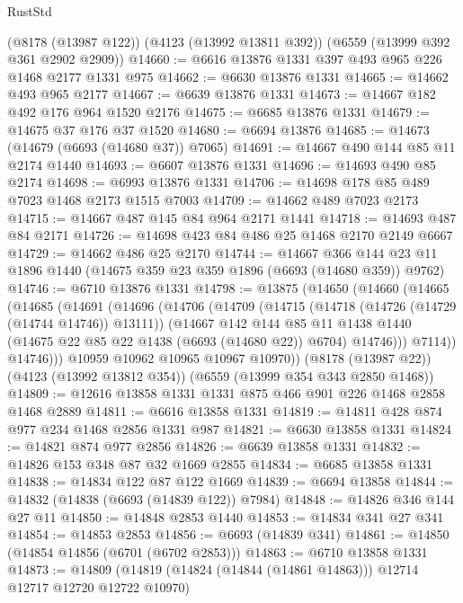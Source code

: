 \begin{lexlean}{RustStd}
\begin{coremodule}
    (@8178 (@13987 @122))
    (@4123 (@13992 @13811 @392))
    (@6559 (@13999 @392 @361 @2902 @2909))
@14660 := @6616 @13876 @1331 @397 @493 @965 @226 @1468 @2177 @1331 @975
@14662 := @6630 @13876 @1331
@14665 := @14662 @493 @965 @2177
@14667 := @6639 @13876 @1331
@14673 := @14667 @182 @492 @176 @964 @1520 @2176
@14675 := @6685 @13876 @1331
@14679 := @14675 @37 @176 @37 @1520
@14680 := @6694 @13876
@14685 := @14673 (@14679 (@6693 (@14680 @37)) @7065)
@14691 := @14667 @490 @144 @85 @11 @2174 @1440
@14693 := @6607 @13876 @1331
@14696 := @14693 @490 @85 @2174
@14698 := @6993 @13876 @1331
@14706 := @14698 @178 @85 @489 @7023 @1468 @2173 @1515 @7003
@14709 := @14662 @489 @7023 @2173
@14715 := @14667 @487 @145 @84 @964 @2171 @1441
@14718 := @14693 @487 @84 @2171
@14726 := @14698 @423 @84 @486 @25 @1468 @2170 @2149 @6667
@14729 := @14662 @486 @25 @2170
@14744 := @14667
    @366
    @144
    @23
    @11
    @1896
    @1440
    (@14675 @359 @23 @359 @1896 (@6693 (@14680 @359)) @9762)
@14746 := @6710 @13876 @1331
@14798 := @13875
    (@14650
      (@14660
        (@14665
          (@14685
            (@14691
              (@14696
                (@14706
                  (@14709
                    (@14715
                      (@14718 (@14726 (@14729 (@14744 @14746)) @13111))
                      (@14667
                        @142
                        @144
                        @85
                        @11
                        @1438
                        @1440
                        (@14675 @22 @85 @22 @1438 (@6693 (@14680 @22)) @6704)
                        @14746)))
                  @7114))
              @14746)))
        @10959
        @10962
        @10965
        @10967
        @10970))
    (@8178 (@13987 @22))
    (@4123 (@13992 @13812 @354))
    (@6559 (@13999 @354 @343 @2850 @1468))
@14809 := @12616 @13858 @1331 @1331 @875 @466 @901 @226 @1468 @2858 @1468 @2889
@14811 := @6616 @13858 @1331
@14819 := @14811 @428 @874 @977 @234 @1468 @2856 @1331 @987
@14821 := @6630 @13858 @1331
@14824 := @14821 @874 @977 @2856
@14826 := @6639 @13858 @1331
@14832 := @14826 @153 @348 @87 @32 @1669 @2855
@14834 := @6685 @13858 @1331
@14838 := @14834 @122 @87 @122 @1669
@14839 := @6694 @13858
@14844 := @14832 (@14838 (@6693 (@14839 @122)) @7984)
@14848 := @14826 @346 @144 @27 @11
@14850 := @14848 @2853 @1440
@14853 := @14834 @341 @27 @341
@14854 := @14853 @2853
@14856 := @6693 (@14839 @341)
@14861 := @14850 (@14854 @14856 (@6701 (@6702 @2853)))
@14863 := @6710 @13858 @1331
@14873 := @14809 (@14819 (@14824 (@14844 (@14861 @14863))) @12714 @12717 @12720 @12722 @10970)

\end{coremodule}
\end{lexlean}
